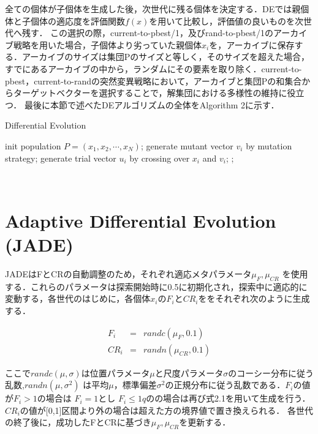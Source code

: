 \documentclass[a4paper,11pt,oneside,openany]{jsbook}
\begin{document}
全ての個体が子個体を生成した後，次世代に残る個体を決定する．DEでは親個体と子個体の適応度を評価関数$f(x)$を用いて比較し，評価値の良いものを次世代へ残す．
この選択の際，current-to-pbest/1，及びrand-to-pbest/1のアーカイブ戦略を用いた場合，子個体より劣っていた親個体$x_{i}$を，アーカイブに保存する．アーカイブのサイズは集団Pのサイズと等しく，そのサイズを超えた場合，すでにあるアーカイブの中から，ランダムにその要素を取り除く．current-to-pbest，current-to-randの突然変異戦略において，アーカイブと集団Pの和集合からターゲットベクターを選択することで，解集団における多様性の維持に役立つ．
最後に本節で述べたDEアルゴリズムの全体をAlgorithm 2に示す．
\begin{algorithm}                      
\caption{Differential Evolution}         
\label{alg:pbnf}                          
\begin{algorithmic}  
\STATE init population ${P} = (x_1, x_2, \cdots, x_N)$;
        \STATE generate mutant vector {$v_i$} by mutation strategy;
        \STATE generate trial vector {$u_i$} by crossing over {$x_i$} and {$v_i$}; 
    \ENDFOR
            ;
        \ENDIF
    \ENDFOR
\ENDWHILE
\end{algorithmic}
\end{algorithm}　　　　　　　　　　　　　　　　　　　　　


\section{Adaptive Differential Evolution (JADE)}
JADEはFとCRの自動調整のため，それぞれ適応メタパラメータ$\mu _F,\mu _{CR}$ を使用する．これらのパラメータは探索開始時に0.5に初期化され，探索中に適応的に変動する，各世代のはじめに，各個体$x_i$の$F_i$と$CR_i$ををそれぞれ次のように生成する．

\begin{eqnarray}
  F_i & = & randc(\mu _F, 0.1) \\
  CR_i & = & randn(\mu _{CR}, 0.1)
\end{eqnarray}

ここで$randc(\mu,　\sigma)$は位置パラメータ$\mu$と尺度パラメータ$\sigma$のコーシー分布に従う乱数,$randn(\mu,\sigma^2)$ は平均$\mu$，標準偏差$\sigma^2$の正規分布に従う乱数である．$F_i$の値が$F_i>1$の場合は
$F_i=1$とし $F_i\le1qの$の場合は再び式2.1を用いて生成を行う．$CR_i$の値が[0,1]区間より外の場合は超えた方の境界値で置き換えられる．
各世代の終了後に，成功したFとCRに基づき$\mu _F, \mu _{CR}$を更新する．
\end{document}
